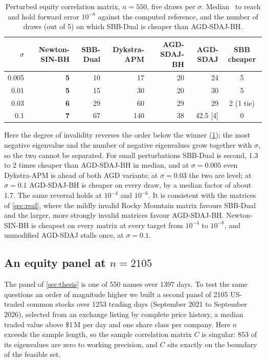 \begin{table}[t]
\centering
\caption{Perturbed equity correlation matrix, $n=550$, five draws per
$\sigma$. Median \EVDs\ to reach and hold forward error $10^{-8}$ against the
computed reference, and the number of draws (out of 5) on which SBB-Dual is
cheaper than AGD-SDAJ-BH.}
\label{tab:thesispert}
\small
\begin{tabular}{rrrrrrc}
\toprule
$\sigma$ & Newton-SIN-BH & SBB-Dual & Dykstra-APM & AGD-SDAJ-BH & AGD-SDAJ & SBB cheaper\\
\midrule
0.005 & \textbf{5} & 10 & 17  & 20 & 24 & 5\\
0.01  & \textbf{5} & 15 & 30  & 20 & 30 & 5\\
0.03  & \textbf{6} & 29 & 60  & 29 & 29 & 2 (1 tie)\\
0.1   & \textbf{7} & 67 & 140 & 38 & 42.5 \tiny[4] & 0\\
\bottomrule
\end{tabular}
\end{table}

Here the degree of invalidity reverses the order below the winner
(\cref{tab:thesispert}); the most negative eigenvalue and the number of
negative eigenvalues grow together with $\sigma$, so the two cannot be
separated. For small perturbations SBB-Dual is second, 1.3 to 2 times cheaper
than AGD-SDAJ-BH in median, and at
$\sigma=0.005$ even Dykstra-APM is ahead of both AGD variants; at
$\sigma=0.03$ the two are level; at
$\sigma=0.1$ AGD-SDAJ-BH is cheaper on every draw, by a median factor of about 1.7.
The same reversal holds at $10^{-4}$ and $10^{-6}$. It is consistent with the
matrices of \cref{sec:real}, where the mildly invalid Rocky Mountain matrix
favours SBB-Dual and the larger, more strongly invalid matrices favour
AGD-SDAJ-BH. Newton-SIN-BH is cheapest on every matrix at every target from
$10^{-4}$ to $10^{-8}$, and unmodified
AGD-SDAJ stalls once, at $\sigma=0.1$.

\subsection{An equity panel at $n=2105$}\label{sec:us2105}
The panel of \cref{sec:thesis} is one of 550 names over 1397 days. To test the
same questions an order of magnitude higher we built a second panel of 2105
US-traded common stocks over 1253 trading days (September 2021 to September
2026), selected from an exchange listing by complete price history, a median
traded value above \$1\,M per day and one share class per company. Here
$n$ exceeds the sample length, so the sample correlation matrix $C$ is singular:
853 of its eigenvalues are zero to working precision, and $C$ sits exactly on
the boundary of the feasible set.

